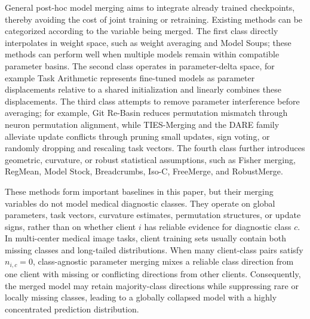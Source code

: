 \documentclass[letterpaper]{article}
\begin{document}
General post-hoc model merging aims to integrate already trained checkpoints, thereby avoiding the cost of joint training or retraining. Existing methods can be categorized according to the variable being merged. The first class directly interpolates in weight space, such as weight averaging and Model Soups; these methods can perform well when multiple models remain within compatible parameter basins. The second class operates in parameter-delta space, for example Task Arithmetic represents fine-tuned models as parameter displacements relative to a shared initialization and linearly combines these displacements. The third class attempts to remove parameter interference before averaging; for example, Git Re-Basin reduces permutation mismatch through neuron permutation alignment, while TIES-Merging and the DARE family alleviate update conflicts through pruning small updates, sign voting, or randomly dropping and rescaling task vectors. The fourth class further introduces geometric, curvature, or robust statistical assumptions, such as Fisher merging, RegMean, Model Stock, Breadcrumbs, Iso-C, FreeMerge, and RobustMerge.


These methods form important baselines in this paper, but their merging variables do not model medical diagnostic classes. They operate on global parameters, task vectors, curvature estimates, permutation structures, or update signs, rather than on whether client $i$ has reliable evidence for diagnostic class $c$. In multi-center medical image tasks, client training sets usually contain both missing classes and long-tailed distributions. When many client-class pairs satisfy $n_{i,c}=0$, class-agnostic parameter merging mixes a reliable class direction from one client with missing or conflicting directions from other clients. Consequently, the merged model may retain majority-class directions while suppressing rare or locally missing classes, leading to a globally collapsed model with a highly concentrated prediction distribution.
\end{document}
